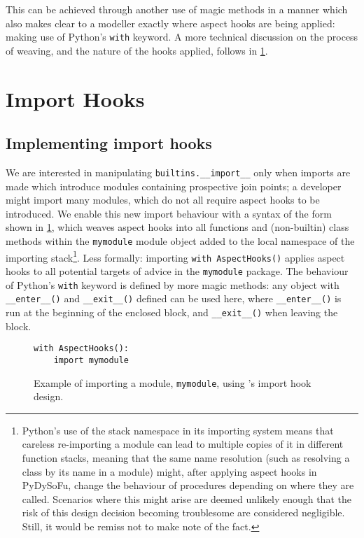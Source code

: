 This can be achieved through another use of magic methods in a manner which also
makes clear to a modeller exactly where aspect hooks are being applied: making
use of Python's \lstinline{with} keyword. A more technical discussion on the
process of weaving, and the nature of the hooks applied, follows in
\cref{sec:import_hooks}.



\section{Import Hooks}\label{sec:import_hooks}

\subsection{Implementing import hooks}\label{subsec:pdsf3implementingimporthooks}

We are interested in manipulating \lstinline{builtins.__import__} only when
imports are made which introduce modules containing prospective join points;
a developer might import many modules, which do not all require aspect hooks to 
be introduced. We enable this new import
behaviour with a syntax of the form shown in \cref{fig:simple_aspect_hook_weaving_example},
which weaves aspect hooks into all functions and (non-builtin)
class methods within the \lstinline{mymodule} module object added to the local
namespace of the importing stack\footnote{Python's use of the stack namespace in
its importing system means that careless re-importing a module can lead to
multiple copies of it in different function stacks, meaning that the same name
resolution (such as resolving a class by its name in a module) might, after
applying aspect hooks in PyDySoFu, change the behaviour of procedures depending
on where they are called. Scenarios where this might arise are deemed unlikely
enough that the risk of this design decision becoming troublesome are considered
negligible. Still, it would be remiss not to make note of the fact.}. Less
formally: importing \lstinline{with AspectHooks()} applies aspect hooks to all
potential targets of advice in the \lstinline{mymodule} package. The behaviour
of Python's \lstinline{with} keyword is defined by more magic methods: any
object with \lstinline{__enter__()} and \lstinline{__exit__()} defined can be
used here, where \lstinline{__enter__()} is run at the beginning of the enclosed
block, and \lstinline{__exit__()} when leaving the block.

\begin{figure}\label{fig:simple_aspect_hook_weaving_example}
\begin{lstlisting}
with AspectHooks():
    import mymodule
\end{lstlisting}
\caption{Example of importing a module, \lstinline{mymodule}, using \pdsf{}'s import hook design.}
\end{figure}


